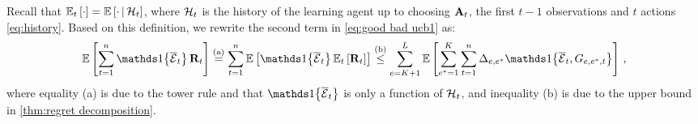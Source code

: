 Recall that $\mathbb{E}_t \left[\cdot\right] = \mathbb{E} \left[\cdot \,\middle|\, \mathcal{H}_t\right]$, where $\mathcal{H}_t$ is the history of the learning agent up to choosing $\mathbf{A}_t$, the first $t - 1$ observations and $t$ actions \eqref{eq:history}. Based on this definition, we rewrite the second term in \eqref{eq:good bad ucb1} as:
\begin{align*}
  \EE{\sum_{t = 1}^n \I{\ccE_t} \rnd{R}_t} \stackrel{\text{(a)}}{=}
  \sum_{t = 1}^n \EE{\I{\ccE_t} \EEt{\rnd{R}_t}} \stackrel{\text{(b)}}{\leq}
  \sum_{e = K + 1}^L \EE{\sum_{e^\ast = 1}^K \sum_{t = 1}^n \Delta_{e, e^\ast} \I{\ccE_t, G_{e, e^\ast, t}}}\,,
\end{align*}
where equality (a) is due to the tower rule and that $\I{\ccE_t}$ is only a function of $\mathcal{H}_t$, and inequality (b) is due to the upper bound in \cref{thm:regret decomposition}.

